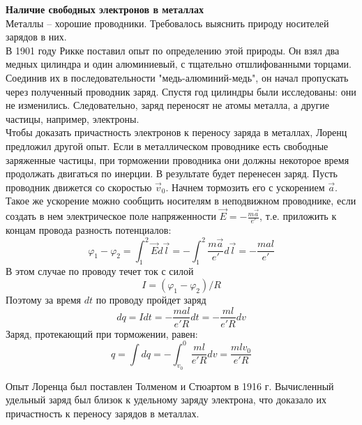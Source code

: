 \documentclass{article}
\begin{document}
	
	\textbf{Наличие свободных электронов в металлах}\\

	Металлы -- хорошие проводники. Требовалось выяснить природу носителей зарядов в них.\\

	В 1901 году Рикке поставил опыт по определению этой природы. Он взял два медных цилиндра и один алюминиевый, с тщательно отшлифованными торцами. Соединив их в последовательности "медь-алюминий-медь", он начал пропускать через полученный проводник заряд. Спустя год цилиндры были исследованы: они не изменились. Следовательно, заряд переносят не атомы металла, а другие частицы, например, электроны. \\

	Чтобы доказать причастность электронов к переносу заряда в металлах, Лоренц предложил другой опыт. Если в металлическом проводнике есть свободные заряженные частицы, при торможении проводника они должны некоторое время продолжать двигаться по инерции. В результате будет перенесен заряд. Пусть проводник движется со скоростью $\vec v_0$. Начнем тормозить его с ускорением $\vec a$. Такое же ускорение можно сообщить носителям в неподвижном проводнике, если создать в нем электрическое поле напряженности $\vec E = -\frac{m\vec a}{e'}$, т.е. приложить к концам провода разность потенциалов:
	\begin{equation}
		\varphi_1 - \varphi_2 = \int_1^2 \vec E d\vec l = -\int_1^2\frac{m\vec a}{e'} d\vec l = -\frac{mal}{e'}
	\end{equation}
	В этом случае по проводу течет ток с силой
	\begin{equation}
		I = (\varphi_1-\varphi_2)/R
	\end{equation}
	Поэтому за время $dt$ по проводу пройдет заряд
	\begin{equation}
		dq = Idt = -\frac{mal}{e'R}dt = -\frac{ml}{e'R}dv
	\end{equation}
	Заряд, протекающий при торможении, равен:
	\begin{equation}
		q = \int dq = -\int_{v_0}^0 \frac{ml}{e'R}dv = \frac{mlv_0}{e'R}
	\end{equation}

	Опыт Лоренца был поставлен Толменом и Стюартом в 1916 г. Вычисленный удельный заряд был близок к удельному заряду электрона, что доказало их причастность к переносу зарядов в металлах.
\end{document}
